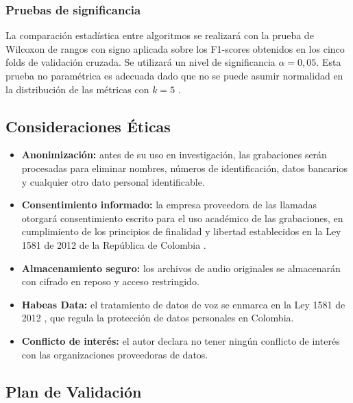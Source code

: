 \subsubsection{Pruebas de significancia}

La comparación estadística entre algoritmos se realizará con la prueba de Wilcoxon de
rangos con signo \cite{wilcoxon1945} aplicada sobre los F1-scores obtenidos en los
cinco folds de validación cruzada. Se utilizará un nivel de significancia $\alpha =
0{,}05$. Esta prueba no paramétrica es adecuada dado que no se puede asumir
normalidad en la distribución de las métricas con $k = 5$ \cite{wilcoxon1945}.

\subsection{Consideraciones Éticas}
\label{sec:met_etica}

\begin{itemize}
    \item \textbf{Anonimización:} antes de su uso en investigación, las grabaciones
          serán procesadas para eliminar nombres, números de identificación, datos
          bancarios y cualquier otro dato personal identificable.
    \item \textbf{Consentimiento informado:} la empresa proveedora de las llamadas
          otorgará consentimiento escrito para el uso académico de las grabaciones,
          en cumplimiento de los principios de finalidad y libertad establecidos en
          la Ley 1581 de 2012 de la República de Colombia \cite{ley1581colombia}.
    \item \textbf{Almacenamiento seguro:} los archivos de audio originales se
          almacenarán con cifrado en reposo y acceso restringido.
    \item \textbf{Habeas Data:} el tratamiento de datos de voz se enmarca en la Ley
          1581 de 2012 \cite{ley1581colombia}, que regula la protección de datos
          personales en Colombia.
    \item \textbf{Conflicto de interés:} el autor declara no tener ningún conflicto
          de interés con las organizaciones proveedoras de datos.
\end{itemize}

\subsection{Plan de Validación}
\label{sec:met_validacion}


